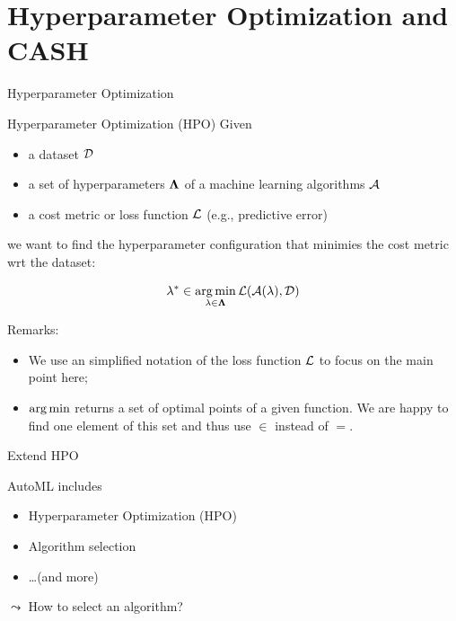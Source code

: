 \section{Hyperparameter Optimization and CASH}
\begin{frame}[c]{Hyperparameter Optimization}

\begin{block}{Hyperparameter Optimization (HPO)}
Given
\begin{itemize}
  \item a dataset $\mathcal{D}$
  \item a set of hyperparameters $\mathbf{\Lambda}$ of a machine learning algorithms $\mathcal{A}$
  \item a cost metric or loss function $\mathcal{L}$ (e.g., predictive error)
\end{itemize}
we want to find the hyperparameter configuration that minimies the cost metric wrt the dataset:

\begin{equation}
\mathbf{\lambda}^* \in \operatorname*{arg\,min}_{\mathbf{\lambda} \in \mathbf{\Lambda}} \mathcal{L}(\mathcal{A}(\mathbf{\lambda}), \mathcal{D}) \nonumber
\end{equation}

\end{block}

\pause
Remarks: 

\begin{itemize}
  \item We use an simplified notation of the loss function $\mathcal{L}$ to focus on the main point here;
  \pause
  \item $\operatorname*{arg\,min}$ returns a set of optimal points of a given function. We are happy to find one element of this set and thus use $\in$ instead of $=$.
\end{itemize}

\end{frame}
\begin{frame}[c]{Extend HPO}

AutoML includes

\begin{itemize}
  \item Hyperparameter Optimization (HPO)
  \item Algorithm selection 
  \item \ldots (and more)
\end{itemize}

\pause
$\leadsto$ How to select an algorithm?


\end{frame}
